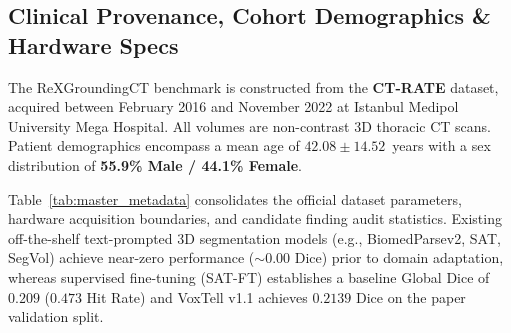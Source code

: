 \documentclass[11pt,a4paper]{article}
\begin{document}
\subsection{Clinical Provenance, Cohort Demographics \& Hardware Specs}
The ReXGroundingCT benchmark is constructed from the \textbf{CT-RATE} dataset, acquired between February 2016 and November 2022 at Istanbul Medipol University Mega Hospital. All volumes are non-contrast 3D thoracic CT scans. Patient demographics encompass a mean age of $42.08 \pm 14.52$~years with a sex distribution of \textbf{55.9\% Male / 44.1\% Female}.

Table~\ref{tab:master_metadata} consolidates the official dataset parameters, hardware acquisition boundaries, and candidate finding audit statistics. Existing off-the-shelf text-prompted 3D segmentation models (e.g., BiomedParsev2, SAT, SegVol) achieve near-zero performance ($\sim 0.00$ Dice) prior to domain adaptation, whereas supervised fine-tuning (SAT-FT) establishes a baseline Global Dice of $0.209$ ($0.473$ Hit Rate) and VoxTell v1.1 achieves $0.2139$ Dice on the paper validation split.
\end{document}
